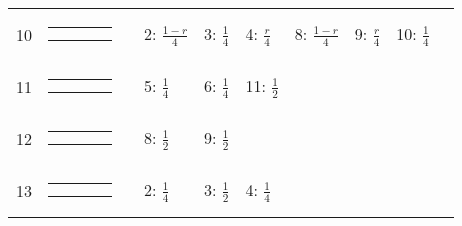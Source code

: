 \begin{center}
\begin{tabular}{ccclllllll}
10 &
{\renewcommand{\arraystretch}{0.3}
\renewcommand{\tabcolsep}{0.5mm}
\parbox[b][3mm][c]{12mm}{
\begin{tabular}{|p{2mm}|p{2mm}||p{2mm}|p{2mm}|} \hline
$\bullet$ & $\bullet$ &           &           \\
$\bullet$ &           & $\bullet$ &           \\ \hline
\end{tabular}}}
&
& 2: $\frac{1-r}{4}$
& 3: $\frac{1}{4}$
& 4: $\frac{r}{4}$
& 8: $\frac{1-r}{4}$
& 9: $\frac{r}{4}$
& 10: $\frac{1}{4}$
& \\
11 &
{\renewcommand{\arraystretch}{0.3}
\renewcommand{\tabcolsep}{0.5mm}
\parbox[b][3mm][c]{12mm}{
\begin{tabular}{|p{2mm}|p{2mm}||p{2mm}|p{2mm}|} \hline
$\bullet$ &           &           &           \\
          &           & $\bullet$ &           \\ \hline
\end{tabular}}}
&
& 5: $\frac{1}{4}$
& 6: $\frac{1}{4}$
& 11: $\frac{1}{2}$
& & & & \\
12 &
{\renewcommand{\arraystretch}{0.3}
\renewcommand{\tabcolsep}{0.5mm}
\parbox[b][3mm][c]{12mm}{
\begin{tabular}{|p{2mm}|p{2mm}||p{2mm}|p{2mm}|} \hline
$\bullet$ & $\bullet$ &           &           \\
          &           & $\bullet$ &           \\ \hline
\end{tabular}}}
&
& 8: $\frac{1}{2}$
& 9: $\frac{1}{2}$
& & & & & \\
13 &
{\renewcommand{\arraystretch}{0.3}
\renewcommand{\tabcolsep}{0.5mm}
\parbox[b][3mm][c]{12mm}{
\begin{tabular}{|p{2mm}|p{2mm}||p{2mm}|p{2mm}|} \hline
$\bullet$ & $\bullet$ &           &           \\
          &           & $\bullet$ & $\bullet$ \\ \hline
\end{tabular}}}
&
& 2: $\frac{1}{4}$
& 3: $\frac{1}{2}$
& 4: $\frac{1}{4}$
& & & & \\
\hline
\end{tabular}
\end{center}
